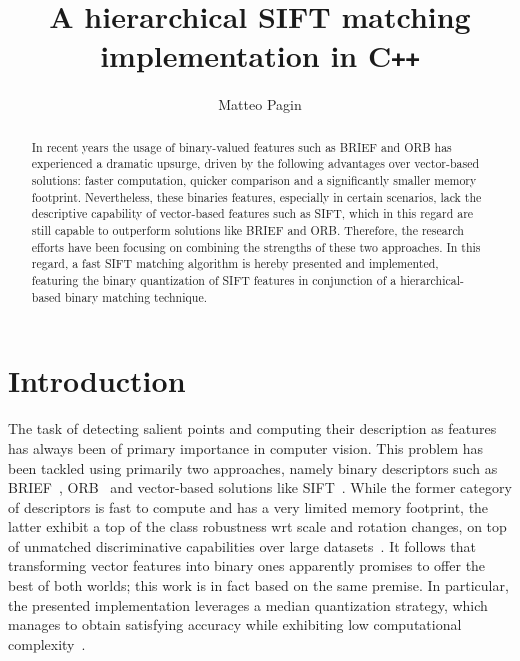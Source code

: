 \documentclass[a4paper, 11pt, oneside]{article}
\date{}
\begin{document}
\title{\vspace{-2.0cm}\huge \textbf{A hierarchical SIFT matching \\ implementation in C\texttt{++}} }
\author[1]{\Large Matteo Pagin}

\maketitle

\thispagestyle{empty}

\begin{abstract}
	In recent years the usage of binary-valued features such as BRIEF and ORB has experienced a dramatic upsurge, driven by the following advantages over vector-based solutions: faster computation, quicker comparison and a significantly smaller memory footprint. Nevertheless, these binaries features, especially in certain scenarios, lack the descriptive capability of vector-based features such as SIFT, which in this regard are still capable to outperform solutions like BRIEF and ORB. Therefore, the research efforts have been focusing on combining the strengths of these two approaches. In this regard, a fast SIFT matching algorithm is hereby presented and implemented, featuring the binary quantization of SIFT features in conjunction of a hierarchical-based binary matching technique.
\end{abstract}

\section*{Introduction}
  The task of detecting salient points and computing their description as features has always been of primary importance in computer vision. This problem has been tackled using primarily two approaches, namely binary descriptors such as BRIEF~\cite{calonder2010brief}, ORB~\cite{rublee2011orb} and vector-based solutions like SIFT~\cite{lowe2004distinctive}. While the former category of descriptors is fast to compute and has a very limited memory footprint, the latter exhibit a top of the class robustness wrt scale and rotation changes, on top of unmatched discriminative capabilities over large datasets~\cite{grauman2005efficient, karami2017image}. It follows that transforming vector features into binary ones apparently promises to offer the best of both worlds; this work is in fact based on the same premise. In particular, the presented implementation leverages a median quantization strategy, which manages to obtain satisfying accuracy while exhibiting low computational complexity~\cite{peker2011binary}.
  
\end{document}
